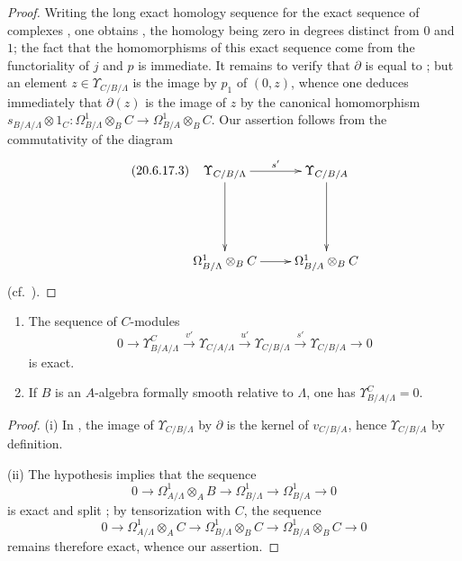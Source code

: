 \begin{proof}
Writing the long exact homology sequence for the exact sequence of complexes , one obtains , the homology being zero in degrees distinct from $0$ and $1$; the fact that the homomorphisms of this exact sequence come from the functoriality of $j$ and $p$ is immediate.
It remains to verify that $\partial$ is equal to ; but an element $z\in\Upsilon_{C/B/\Lambda}$ is the image by $p_1$ of $(0,z)$, whence one deduces immediately that $\partial(z)$ is the image of $z$ by the canonical homomorphism $s_{B/A/\Lambda}\otimes 1_C:\Omega^1_{B/\Lambda}\otimes_B C\to\Omega^1_{B/A}\otimes_B C$.
Our assertion follows from the commutativity of the diagram
\begin{equation}
\tag{20.6.17.3}
  \label{0.20.6.17.3}
\xymatrix{
  \Upsilon_{C/B/\Lambda} \ar[r]^{s'} \ar[dd] & \Upsilon_{C/B/A} \ar[dd] \\
  & \\
  \Omega^1_{B/\Lambda}\otimes_B C \ar[r] & \Omega^1_{B/A}\otimes_B C
}
\end{equation}
(cf.\ ).
\end{proof}

\begin{corollary}[20.6.18]
\label{0.20.6.18}
\begin{enumerate}
  \item[\rm(i)] The sequence of $C$-modules
\begin{equation}
\tag{20.6.18.1}
  \label{0.20.6.18.1}
  0\to\Upsilon^C_{B/A/\Lambda}\xrightarrow{v'}\Upsilon_{C/A/\Lambda}\xrightarrow{u'}\Upsilon_{C/B/\Lambda}\xrightarrow{s'}\Upsilon_{C/B/A}\to 0
\end{equation}
is exact.
  \item[\rm(ii)] If $B$ is an $A$-algebra formally smooth relative to $\Lambda$, one has $\Upsilon^C_{B/A/\Lambda}=0$.
\end{enumerate}
\end{corollary}

\begin{proof}
(i) In , the image of $\Upsilon_{C/B/\Lambda}$ by $\partial$ is the kernel of $v_{C/B/A}$, hence $\Upsilon_{C/B/A}$ by definition.

(ii) The hypothesis implies that the sequence
\[
  0\to\Omega^1_{A/\Lambda}\otimes_A B\to\Omega^1_{B/\Lambda}\to\Omega^1_{B/A}\to 0
\]
is exact and split ; by tensorization with $C$, the sequence
\[
  0\to\Omega^1_{A/\Lambda}\otimes_A C\to\Omega^1_{B/\Lambda}\otimes_B C\to\Omega^1_{B/A}\otimes_B C\to 0
\]
remains therefore exact, whence our assertion.
\end{proof}

